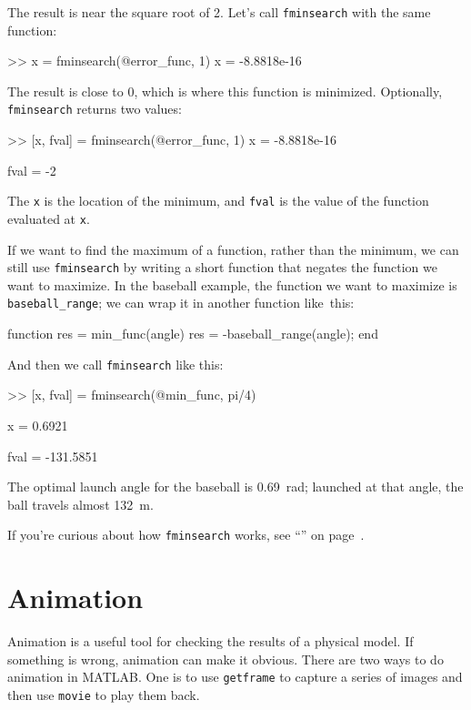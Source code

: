 The result is near the square root of 2.  Let's call \lstinline{fminsearch} with the same function:

\begin{code}
>> x = fminsearch(@error_func, 1)
x = -8.8818e-16
\end{code}

The result is close to 0, which is where this function is minimized.  Optionally, \lstinline{fminsearch} returns two values:

\begin{code}
>> [x, fval] = fminsearch(@error_func, 1)
x = -8.8818e-16

fval = -2
\end{code}

The \lstinline{x} is the location of the minimum, and \lstinline{fval} is the value of the function evaluated at \lstinline{x}.

If we want to find the maximum of a function, rather than the minimum, we can still use \lstinline{fminsearch} by writing a short function that negates the function we want to maximize.
In the baseball example, the function we want to maximize is \lstinline{baseball_range}; we can wrap it in another function like~this:

\begin{code}
function res = min_func(angle)
    res = -baseball_range(angle);
end
\end{code}

And then we call \lstinline{fminsearch} like this:

\begin{code}
>> [x, fval] = fminsearch(@min_func, pi/4)

x = 0.6921

fval = -131.5851
\end{code}

The optimal launch angle for the baseball is \SI{0.69}{\radian}; launched at that angle, the ball travels almost \SI{132}{\meter}.

If you're curious about how \lstinline{fminsearch} works, see ``'' on page~\pageref{howfminsearch}.


\section{Animation}

Animation is a useful tool for checking the results of a physical model.  
If something is wrong, animation can make it obvious.
There are two ways to do animation in MATLAB.  
One is to use \lstinline{getframe} to capture a series of images and then use \lstinline{movie} to play them back.

